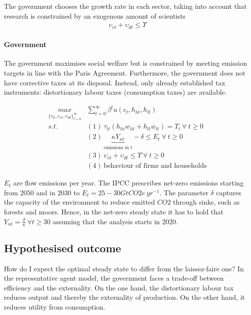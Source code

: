 The government chooses the growth rate in each sector, taking into account that research is constrained by an exogenous  amount of scientists
\begin{align}
\upsilon_{ct}+\upsilon_{dt}\leq\Upsilon
\end{align}
 
  
\paragraph{Government}

The government maximises social welfare but is constrained by meeting emission targets in line with the Paris Agreement. Furthermore, the government does not have corrective taxes at its disposal. Instead, only already established tax instruments: distortionary labour taxes (consumption taxes) are available. 

\begin{align*}
\underset{\{\tau_{lt}, \upsilon_{ct}, \upsilon_{dt}\}_{t=0}^{\infty}}{max}&\sum_{t=0}^{\infty}\beta^t u(c_{t}, h_{ht}, h_{lt})\\
s.t.\ & (1)\  \tau_{lt}(h_{ht}w_{ht}+h_{lt}w_{lt})=T_t\  \forall \ t\geq 0\\
& (2)\ \underbrace{\kappa Y_{nt}}_{\text{emissions in t}} -\delta \leq E_t \  \forall \ t\geq 0\\
& (3)\ \upsilon_{ct}+\upsilon_{dt}\leq\Upsilon\  \forall \ t\geq 0\\
& (4)\ \text{behaviour of firms and households}
\end{align*}

$E_t$ are flow emissions per year. The IPCC prescribes net-zero emissions starting from 2050 and in 2030 to $E_t= 25-30GtCO2e\ yr^{-1}$. The parameter $\delta$ captures the capacity of the environment to reduce emitted $CO2$ through sinks, such as forests and moors. Hence, in the net-zero steady state it has to hold that $Y_{nt}=\frac{\delta}{\kappa}\ \forall t\geq 30$ assuming that the analysis starts in 2020. 

\subsection{Hypothesised outcome}
How do I expect the optimal steady state to differ from the laissez-faire one? 
In the representative agent model, the government faces a trade-off  between efficiency and the externality. 
On the one hand, the distortionary labour tax reduces output and thereby the externality of production. On the other hand, it reduces utility from consumption.

